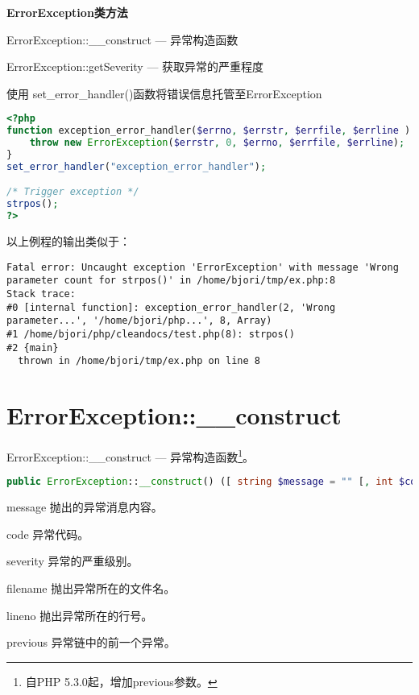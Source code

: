 \textbf{ErrorException类方法}

\begin{compactitem}
\item ErrorException::\_\_construct — 异常构造函数
\item ErrorException::getSeverity — 获取异常的严重程度
\end{compactitem}



\begin{example}
使用 set\_error\_handler()函数将错误信息托管至ErrorException
\begin{lstlisting}[language=PHP]
<?php
function exception_error_handler($errno, $errstr, $errfile, $errline ) {
    throw new ErrorException($errstr, 0, $errno, $errfile, $errline);
}
set_error_handler("exception_error_handler");

/* Trigger exception */
strpos();
?>
\end{lstlisting}
\end{example}

以上例程的输出类似于：

\begin{verbatim}
Fatal error: Uncaught exception 'ErrorException' with message 'Wrong parameter count for strpos()' in /home/bjori/tmp/ex.php:8
Stack trace:
#0 [internal function]: exception_error_handler(2, 'Wrong parameter...', '/home/bjori/php...', 8, Array)
#1 /home/bjori/php/cleandocs/test.php(8): strpos()
#2 {main}
  thrown in /home/bjori/tmp/ex.php on line 8
\end{verbatim}



\section{ErrorException::\_\_construct}


ErrorException::\_\_construct — 异常构造函数\footnote{自PHP 5.3.0起，增加previous参数。}。

\begin{lstlisting}[language=PHP]
public ErrorException::__construct() ([ string $message = "" [, int $code = 0 [, int $severity = 1 [, string $filename = __FILE__ [, int $lineno = __LINE__ [, Exception $previous = NULL ]]]]]] )
\end{lstlisting}

\begin{compactitem}
\item message
抛出的异常消息内容。
\item code
异常代码。
\item severity
异常的严重级别。
\item filename
抛出异常所在的文件名。
\item lineno
抛出异常所在的行号。
\item previous
异常链中的前一个异常。
\end{compactitem}


